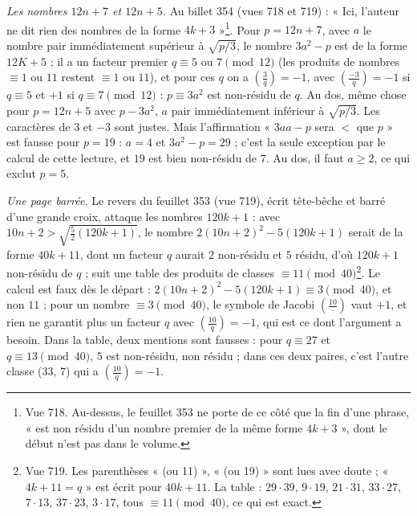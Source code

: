 \documentclass[11pt,a4paper]{article}
\begin{document}
\emph{Les nombres $12n+7$ et $12n+5$.} Au billet 354 (vues 718 et 719) : « Ici, l'auteur ne dit rien des nombres de la forme $4k+3$ »\footnote{Vue 718. Au-dessus, le feuillet 353 ne porte de ce côté que la fin d'une phrase, « est non résidu d'un nombre premier de la même forme $4k+3$ », dont le début n'est pas dans le volume.}. Pour $p=12n+7$, avec $a$ le nombre pair immédiatement supérieur à $\sqrt{p/3}$, le nombre $3a^2-p$ est de la forme $12K+5$ ; il a un facteur premier $q\equiv 5$ ou $7\pmod{12}$ (les produits de nombres $\equiv 1$ ou $11$ restent $\equiv1$ ou $11$), et pour ces $q$ on a $\left(\frac{3}{q}\right)=-1$, avec $\left(\frac{-3}{q}\right)=-1$ si $q\equiv5$ et $+1$ si $q\equiv7\pmod{12}$ : $p\equiv 3a^2$ est non-résidu de $q$. Au dos, même chose pour $p=12n+5$ avec $p-3a^2$, $a$ pair immédiatement inférieur à $\sqrt{p/3}$. Les caractères de $3$ et $-3$ sont justes. Mais l'affirmation « $3aa-p$ sera $<$ que $p$ » est fausse pour $p=19$ : $a=4$ et $3a^2-p=29$ ; c'est la seule exception par le calcul de cette lecture, et $19$ est bien non-résidu de $7$. Au dos, il faut $a\ge 2$, ce qui exclut $p=5$.

\emph{Une page barrée.} Le revers du feuillet 353 (vue 719), écrit tête-bêche et barré d'une grande croix, attaque les nombres $120k+1$ : avec $10n+2>\sqrt{\tfrac52(120k+1)}$, le nombre $2(10n+2)^2-5(120k+1)$ serait de la forme $40k+11$, dont un facteur $q$ aurait $2$ non-résidu et $5$ résidu, d'où $120k+1$ non-résidu de $q$ ; suit une table des produits de classes $\equiv 11\pmod{40}$\footnote{Vue 719. Les parenthèses « (ou 11) », « (ou 19) » sont lues avec doute ; « $4k+11=q$ » est écrit pour $40k+11$. La table : $29\cdot39$, $9\cdot19$, $21\cdot31$, $33\cdot27$, $7\cdot13$, $37\cdot23$, $3\cdot17$, tous $\equiv 11\pmod{40}$, ce qui est exact.}. Le calcul est faux dès le départ : $2(10n+2)^2-5(120k+1)\equiv 3\pmod{40}$, et non $11$ ; pour un nombre $\equiv 3\pmod{40}$, le symbole de Jacobi $\left(\frac{10}{\cdot}\right)$ vaut $+1$, et rien ne garantit plus un facteur $q$ avec $\left(\frac{10}{q}\right)=-1$, qui est ce dont l'argument a besoin. Dans la table, deux mentions sont fausses : pour $q\equiv 27$ et $q\equiv 13\pmod{40}$, $5$ est non-résidu, non résidu ; dans ces deux paires, c'est l'autre classe ($33$, $7$) qui a $\left(\frac{10}{q}\right)=-1$.
\end{document}
